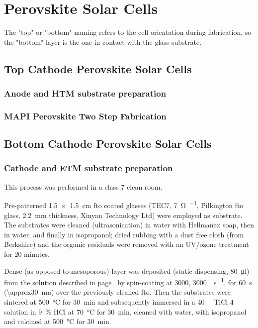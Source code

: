 \section{Perovskite Solar Cells}

	The "top" or "bottom" naming refers to the cell orientation during fabrication, so the "bottom" layer is the one in contact with the glass substrate.

	\subsection{Top Cathode Perovskite Solar Cells}

		\subsubsection{Anode and HTM substrate preparation}
		
		\subsubsection{MAPI Perovskite Two Step Fabrication}
	
	\subsection{Bottom Cathode Perovskite Solar Cells}

	
		\subsubsection{Cathode and ETM substrate preparation}
			This process was performed in a class 7 clean room.
		
			Pre-patterned \SI[product-units = single]{1.5 x 1.5}{\cm} \gls{fto} coated glasses (TEC7, \SI{7}{\ohm\per\sq}, Pilkington	\gls{fto} glass, \SI{2.2}{\mm} thickness, Xinyan Technology Ltd) were employed as substrate. The substrates were cleaned (ultrasonication) in water with Hellmanex soap, then in water, and finally in isopropanol; dried rubbing with a dust free cloth (from Berkshire) and the organic residuals were removed with an UV/ozone treatment for 20 minutes.
			
			Dense (as opposed to mesoporous) \TiOtwo layer was deposited (static dispensing, \SI{80}{\ul}) from the solution described in page~\pageref{dense-tio2} by spin-coating at \SI{3000}{\rpm}, \SI{3000}{\rpm\per\s}, for \SI{60}{\s} (\SI{\approx30}{\nm}) over the previously cleaned \gls{fto}. Then
			the substrates were sintered at \SI{500}{\celsius} for \SI{30}{\minute} and subsequently immersed in a \SI{40}{\milli\Molar}
			TiCl 4 solution in 9~\% HCl at \SI{70}{\celsius} for \SI{30}{\minute}, cleaned with water, with isopropanol and
			calcined at \SI{500}{\celsius} for \SI{30}{\minute}.
			
